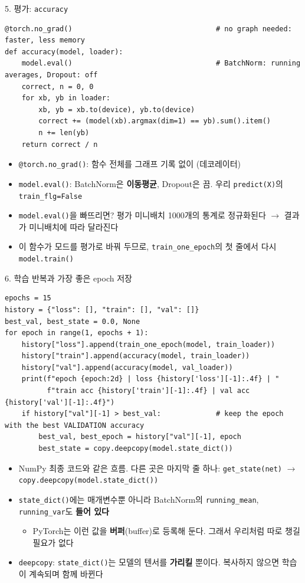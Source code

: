 \documentclass[aspectratio=169,11pt]{beamer}
\newcommand{\codetiny}{\ttfamily\fontsize{6.8}{7.6}\selectfont}
\newcommand{\code}[1]{\texttt{#1}}
\begin{document}
\begin{frame}[fragile]{5. 평가: \code{accuracy}}
\begin{lstlisting}
@torch.no_grad()                                  # no graph needed: faster, less memory
def accuracy(model, loader):
    model.eval()                                  # BatchNorm: running averages, Dropout: off
    correct, n = 0, 0
    for xb, yb in loader:
        xb, yb = xb.to(device), yb.to(device)
        correct += (model(xb).argmax(dim=1) == yb).sum().item()
        n += len(yb)
    return correct / n
\end{lstlisting}
\begin{itemize}
\item \code{@torch.no\_grad()}: 함수 전체를 그래프 기록 없이 (데코레이터)
\item \code{model.eval()}: BatchNorm은 \textbf{이동평균}, Dropout은 끔. 우리 \code{predict(X)}의 \code{train\_flg=False}
\item \code{model.eval()}을 빠뜨리면? 평가 미니배치 1000개의 통계로 정규화된다 $\to$ 결과가 미니배치에 따라 달라진다
\item 이 함수가 모드를 평가로 바꿔 두므로, \code{train\_one\_epoch}의 첫 줄에서 다시 \code{model.train()}
\end{itemize}
\end{frame}

\begin{frame}{6. 학습 반복과 가장 좋은 epoch 저장}
\footnotesize
\begin{lstlisting}[basicstyle=\codetiny]
epochs = 15
history = {"loss": [], "train": [], "val": []}
best_val, best_state = 0.0, None
for epoch in range(1, epochs + 1):
    history["loss"].append(train_one_epoch(model, train_loader))
    history["train"].append(accuracy(model, train_loader))
    history["val"].append(accuracy(model, val_loader))
    print(f"epoch {epoch:2d} | loss {history['loss'][-1]:.4f} | "
          f"train acc {history['train'][-1]:.4f} | val acc {history['val'][-1]:.4f}")
    if history["val"][-1] > best_val:             # keep the epoch with the best VALIDATION accuracy
        best_val, best_epoch = history["val"][-1], epoch
        best_state = copy.deepcopy(model.state_dict())
\end{lstlisting}
\small
\begin{itemize}
\item NumPy 최종 코드와 같은 흐름. 다른 곳은 마지막 줄 하나: \code{get\_state(net)} $\to$ \code{copy.deepcopy(model.state\_dict())}
\item \code{state\_dict()}에는 매개변수뿐 아니라 BatchNorm의 \code{running\_mean}, \code{running\_var}도 \textbf{들어 있다}
\begin{itemize}
\item PyTorch는 이런 값을 \textbf{버퍼}(buffer)로 등록해 둔다. 그래서 우리처럼 따로 챙길 필요가 없다
\end{itemize}
\item \code{deepcopy}: \code{state\_dict()}는 모델의 텐서를 \textbf{가리킬} 뿐이다. 복사하지 않으면 학습이 계속되며 함께 바뀐다
\end{itemize}
\end{frame}
\end{document}
